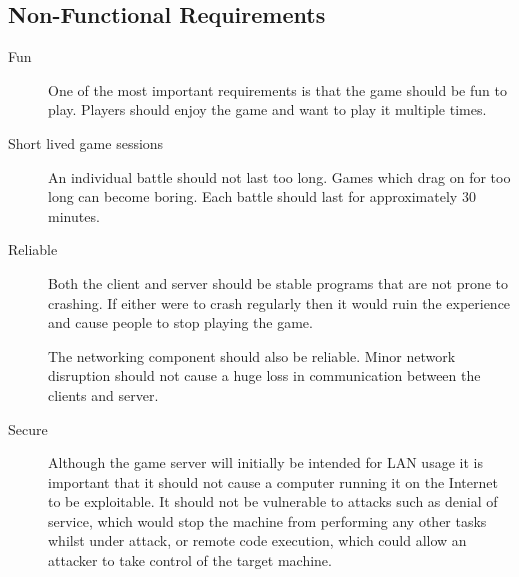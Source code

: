 \subsection{Non-Functional Requirements}

\begin{description}

	\item[Fun]

	One of the most important requirements is that the game should be fun to play.
	Players should enjoy the game and want to play it multiple times.

	\item[Short lived game sessions]

	An individual battle should not last too long. Games which drag on for too long
	can become boring. Each battle should last for approximately 30 minutes.

	\item[Reliable]

	Both the client and server should be stable programs that are not prone to
	crashing. If either were to crash regularly then it would ruin the experience
	and cause people to stop playing the game.

	The networking component should also be reliable. Minor network disruption should
	not cause a huge loss in communication between the clients and server.

	\item[Secure]

	Although the game server will initially be intended for LAN usage it is
	important that it should not cause a computer running it on the Internet to be
	exploitable. It should not be vulnerable to attacks such as denial of service,
	which would stop the machine from performing any other tasks whilst under attack,
	or remote code execution, which could allow an attacker to take control of the
	target machine.


\end{description}

